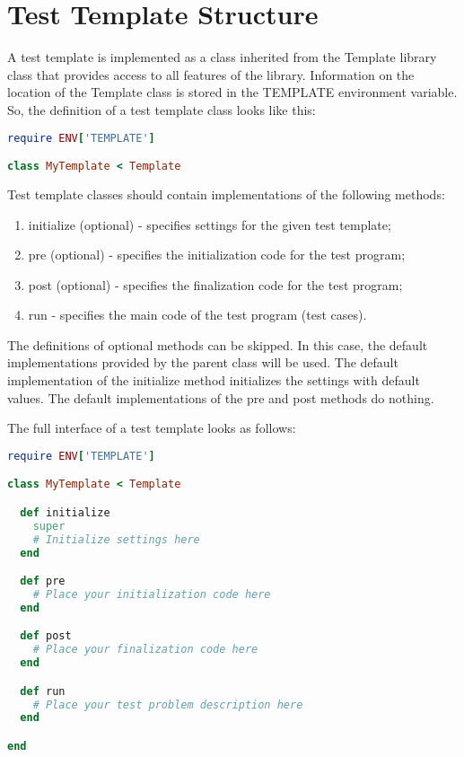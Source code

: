 \documentclass[oneside,final,14pt]{extreport}
\begin{document}

\section{Test Template Structure}

A test template is implemented as a class inherited from the Template library class
that provides access to all features of the library. Information on the location of
the Template class is stored in the TEMPLATE environment variable. So, the definition
of a test template class looks like this:

\begin{lstlisting}[language=ruby]
require ENV['TEMPLATE']

class MyTemplate < Template
\end{lstlisting}

Test template classes should contain implementations of the following methods:

\begin{enumerate}
  \item initialize (optional) - specifies settings for the given test template;
  \item pre (optional) - specifies the initialization code for the test program;
  \item post (optional) - specifies the finalization code for the test program;
  \item run - specifies the main code of the test program (test cases).
\end{enumerate}

The definitions of optional methods can be skipped. In this case, the default
implementations provided by the parent class will be used. The default implementation
of the initialize method initializes the settings with default values. The default
implementations of the pre and post methods do nothing.

The full interface of a test template looks as follows:

\begin{lstlisting}[language=ruby]
require ENV['TEMPLATE']

class MyTemplate < Template

  def initialize
    super
    # Initialize settings here 
  end

  def pre
    # Place your initialization code here
  end

  def post
    # Place your finalization code here
  end

  def run
    # Place your test problem description here
  end

end
\end{lstlisting}
\end{document}
